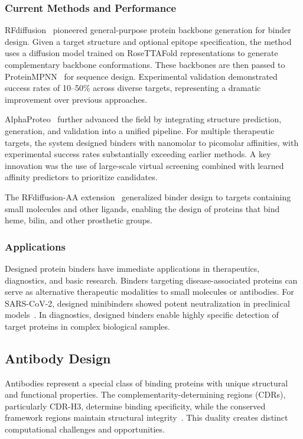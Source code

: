 \subsubsection{Current Methods and Performance}

RFdiffusion~\cite{watson2023rfdiffusion} pioneered general-purpose protein backbone generation for binder design. Given a target structure and optional epitope specification, the method uses a diffusion model trained on RoseTTAFold representations to generate complementary backbone conformations. These backbones are then passed to ProteinMPNN~\cite{dauparas2022proteinmpnn} for sequence design. Experimental validation demonstrated success rates of 10--50\% across diverse targets, representing a dramatic improvement over previous approaches.

AlphaProteo~\cite{zambaldi2024alphaproteo} further advanced the field by integrating structure prediction, generation, and validation into a unified pipeline. For multiple therapeutic targets, the system designed binders with nanomolar to picomolar affinities, with experimental success rates substantially exceeding earlier methods. A key innovation was the use of large-scale virtual screening combined with learned affinity predictors to prioritize candidates.

The RFdiffusion-AA extension~\cite{krishna2024rfaa} generalized binder design to targets containing small molecules and other ligands, enabling the design of proteins that bind heme, bilin, and other prosthetic groups.

\subsubsection{Applications}

Designed protein binders have immediate applications in therapeutics, diagnostics, and basic research. Binders targeting disease-associated proteins can serve as alternative therapeutic modalities to small molecules or antibodies. For SARS-CoV-2, designed minibinders showed potent neutralization in preclinical models~\cite{watson2023rfdiffusion}. In diagnostics, designed binders enable highly specific detection of target proteins in complex biological samples.

\subsection{Antibody Design}
\label{subsec:antibody}

Antibodies represent a special class of binding proteins with unique structural and functional properties. The complementarity-determining regions (CDRs), particularly CDR-H3, determine binding specificity, while the conserved framework regions maintain structural integrity~\cite{ruffolo2022deepab}. This duality creates distinct computational challenges and opportunities.

